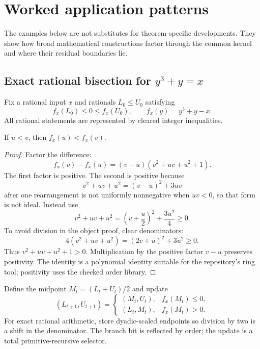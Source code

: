 \section{Worked application patterns}
\label{sec:applications}

The examples below are not substitutes for theorem-specific developments.  They show how broad mathematical constructions factor through the common kernel and where their residual boundaries lie.

\subsection{Exact rational bisection for \(y^3+y=x\)}
\label{sec:cubic-example}

Fix a rational input \(x\) and rationals \(L_0\leq U_0\) satisfying
\begin{equation}
  f_x(L_0)\leq0\leq f_x(U_0),
  \qquad f_x(y)=y^3+y-x.
  \label{eq:cubic-bracket}
\end{equation}
All rational statements are represented by cleared integer inequalities.

\begin{lemma}
If \(u<v\), then \(f_x(u)<f_x(v)\).
\end{lemma}

\begin{proof}
Factor the difference:
\[
 f_x(v)-f_x(u)
 =(v-u)(v^2+uv+u^2+1).
\]
The first factor is positive.  The second is positive because
\[
 v^2+uv+u^2
 = (v-u)^2+3uv
\]
after one rearrangement is not uniformly nonnegative when \(uv<0\), so that form is not ideal.  Instead use
\[
 v^2+uv+u^2
 = \left(v+\frac{u}{2}\right)^2+\frac{3u^2}{4}\geq0.
\]
To avoid division in the object proof, clear denominators:
\[
 4(v^2+uv+u^2)=(2v+u)^2+3u^2\geq0.
\]
Thus \(v^2+uv+u^2+1>0\).  Multiplication by the positive factor \(v-u\) preserves positivity.  The identity is a polynomial identity suitable for the repository's ring tool; positivity uses the checked order library.
\end{proof}

Define the midpoint \(M_t=(L_t+U_t)/2\) and update
\[
 (L_{t+1},U_{t+1})=
 \begin{cases}
   (M_t,U_t),& f_x(M_t)\leq0,\\
   (L_t,M_t),& f_x(M_t)>0.
 \end{cases}
\]
For exact rational arithmetic, store dyadic-scaled endpoints so division by two is a shift in the denominator.  The branch bit is reflected by order; the update is a total primitive-recursive selector.

